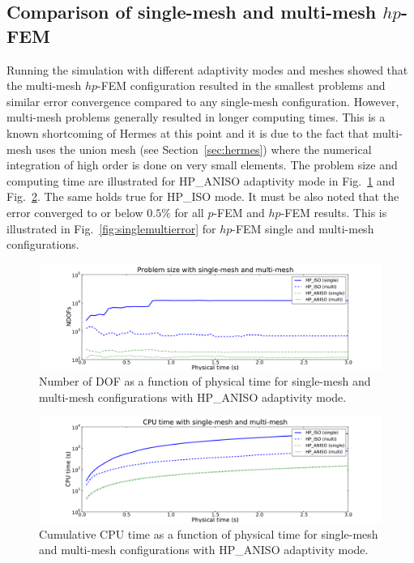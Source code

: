 \subsection{Comparison of single-mesh and multi-mesh $hp$-FEM}
Running the simulation with different adaptivity modes 
and meshes showed that the multi-mesh $hp$-FEM configuration resulted in
the smallest problems and similar error 
convergence compared to any single-mesh configuration. However,
multi-mesh problems generally resulted in longer computing times. This is a known
shortcoming of Hermes at this point and it is due to the fact that
multi-mesh uses the union mesh (see Section~\ref{sec:hermes}) where 
the numerical integration of high order is done on very small elements.
The problem size and computing time are illustrated for HP\_ANISO adaptivity mode in Fig.~\ref{fig:singlemultidof} and Fig.~\ref{fig:singlemulticpu}.
The same holds true for HP\_ISO mode.  It must be also noted that the error
converged to or below $0.5\%$ for all $p$-FEM and $hp$-FEM results. This is illustrated in
Fig.~\ref{fig:singlemultierror} for $hp$-FEM single and multi-mesh configurations.
 
\begin{figure}[!ht]
  \begin{centering}
  \includegraphics[width=\columnwidth]{singlemulti_dof}
  \caption{\label{fig:singlemultidof} Number of DOF as a function 
  of physical time for single-mesh and multi-mesh configurations with 
  HP\_ANISO adaptivity mode.}
  \end{centering}
\end{figure}


\begin{figure}[!ht]
  \begin{centering}
  \includegraphics[width=\columnwidth]{singlemulti_cpu}
  \caption{\label{fig:singlemulticpu} Cumulative CPU time as a function 
  of physical time for single-mesh and multi-mesh configurations with 
  HP\_ANISO adaptivity mode.}
  \end{centering}
\end{figure}

